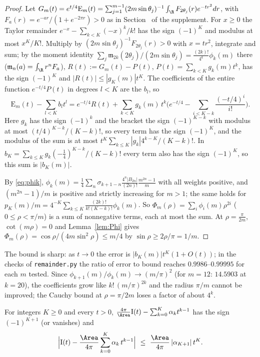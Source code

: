 \begin{proof}
Let $G_m(t)=e^{t/4}\mathrm E_m(t)=\sum_{j=1}^{m-1}(2m\sin\theta_j)^{-1}\int_\R F_{2\theta_j}(r)e^{-tr^2}dr$, with $F_a(r)=e^{-ar}/(1+e^{-2\pi r})>0$ as in Section~ of the supplement. For $x\ge0$ the Taylor remainder $e^{-x}-\sum_{k<K}(-x)^k/k!$ has the sign $(-1)^K$ and modulus at most $x^K/K!$. Multiply by $(2m\sin\theta_j)^{-1}F_{2\theta_j}(r)>0$ with $x=tr^2$, integrate and sum; by the moment identity $\sum_j\mathfrak m_{2k}(2\theta_j)/(2m\sin\theta_j)=\frac{(2k)!}{4^k}\phi_k(m)$ there ($\mathfrak m_n(a)=\int_\R r^nF_a$), $R(t):=G_m(t)-P(t)$, $P(t)=\sum_{k<K}g_k(m)t^k$, has the sign $(-1)^K$ and $|R(t)|\le|g_K(m)|t^K$. The coefficients of the entire function $e^{-t/4}P(t)$ in degrees $l<K$ are the $b_l$, so
\[
  \mathrm E_m(t)-\sum_{l<K}b_lt^l=e^{-t/4}R(t)+\sum_{k<K}g_k(m)\,t^k\Big(e^{-t/4}-\sum_{i<K-k}\frac{(-t/4)^i}{i!}\Big).
\]
Here $g_k$ has the sign $(-1)^k$ and the bracket the sign $(-1)^{K-k}$ with modulus at most $(t/4)^{K-k}/(K-k)!$, so every term has the sign $(-1)^K$, and the modulus of the sum is at most $t^K\sum_{k\le K}|g_k|4^{k-K}/(K-k)!$. In $b_K=\sum_{k\le K}g_k(-\frac14)^{K-k}/(K-k)!$ every term also has the sign $(-1)^K$, so this sum is $|b_K(m)|$.

By \eqref{eq:phik}, $\phi_k(m)=\frac14\sum_n\sigma_{k+1-n}\frac{4^n|B_{2n}|}{(2n)!}\frac{m^{2n}-1}m$ with all weights positive, and $(m^{2n}-1)/m$ is positive and strictly increasing for $m>1$; the same holds for $p_K(m)/m=4^{-K}\sum_{k\le K}\frac{(2k)!}{k!(K-k)!}\phi_k(m)$. So $\Phi_m(\rho)=\sum_i\phi_i(m)\rho^{2i}$ ($0\le\rho<\pi/m$) is a sum of nonnegative terms, each at most the sum. At $\rho=\frac\pi{2m}$, $\cot(m\rho)=0$ and Lemma~\ref{lem:Phi} gives $\Phi_m(\rho)=\cos\rho/(4m\sin^2\rho)\le m/4$ by $\sin\rho\ge2\rho/\pi=1/m$.
\end{proof}

The bound is sharp: as $t\to0$ the error is $|b_K(m)|t^K(1+O(t))$; in the checks of \texttt{remainder.py} the ratio of error to bound reaches $0.9986$--$0.99995$ for each $m$ tested. Since $\phi_{k+1}(m)/\phi_k(m)\to(m/\pi)^2$ (for $m=12$: $14.5903$ at $k=20$), the coefficients grow like $k!\,(m/\pi)^{2k}$ and the radius $\pi/m$ cannot be improved; the Cauchy bound at $\rho=\pi/2m$ loses a factor of about $4^k$.

\begin{proposition}\label{eig:remarea}
For integers $K\ge0$ and every $t>0$, $\frac{4\pi}{\Area}\mathrm I(t)-\sum_{k=0}^K\alpha_kt^{k-1}$ has the sign $(-1)^{K+1}$ (or vanishes) and
\[
  \Big|\mathrm I(t)-\frac{\Area}{4\pi}\sum_{k=0}^K\alpha_k\,t^{k-1}\Big|\ \le\ \frac{\Area}{4\pi}\,|\alpha_{K+1}|\,t^K .
\]
\end{proposition}

